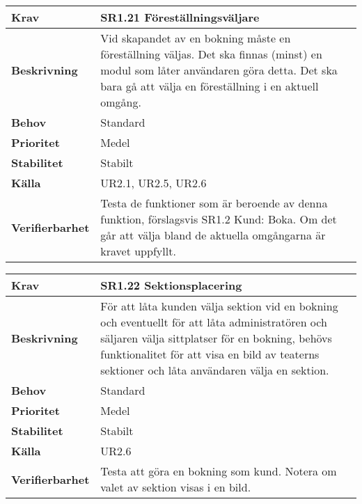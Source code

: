 \documentclass[a4paper, twoside, 11pt, titlepage]{article}
\begin{document}
	\begin{tabular} { p{2.6cm} p{12.5cm} }
		\hline
		\sffamily\textbf{Krav} & \sffamily\textbf{SR1.21 Föreställningsväljare } \\
		\hline
		\sffamily\textbf{Beskrivning} & Vid skapandet av en bokning måste en föreställning väljas. Det ska finnas (minst) en modul som låter användaren göra detta. Det ska bara gå att välja en föreställning i en aktuell omgång.  \\
		\hline
		\sffamily\textbf{Behov} & Standard  \\
		\hline
		\sffamily\textbf{Prioritet} & Medel  \\
		\hline
		\sffamily\textbf{Stabilitet} & Stabilt  \\
		\hline
		\sffamily\textbf{Källa} & UR2.1, UR2.5, UR2.6  \\
		\hline
		\sffamily\textbf{Verifierbarhet} & Testa de funktioner som är beroende av denna funktion, förslagsvis SR1.2 Kund: Boka. Om det går att välja bland de aktuella omgångarna är kravet uppfyllt.  \\
		\hline
	\end{tabular}
	\vspace{6mm}

	\begin{tabular} { p{2.6cm} p{12.5cm} }
		\hline
		\sffamily\textbf{Krav} & \sffamily\textbf{SR1.22 Sektionsplacering } \\
		\hline
		\sffamily\textbf{Beskrivning} & För att låta kunden välja sektion vid en bokning och eventuellt för att låta administratören och säljaren välja sittplatser för en bokning, behövs funktionalitet för att visa en bild av teaterns sektioner och låta användaren välja en sektion.  \\
		\hline
		\sffamily\textbf{Behov} & Standard  \\
		\hline
		\sffamily\textbf{Prioritet} & Medel  \\
		\hline
		\sffamily\textbf{Stabilitet} & Stabilt  \\
		\hline
		\sffamily\textbf{Källa} & UR2.6  \\
		\hline
		\sffamily\textbf{Verifierbarhet} & Testa att göra en bokning som kund. Notera om valet av sektion visas i en bild.  \\
		\hline
	\end{tabular}
	\vspace{6mm}
\end{document}
